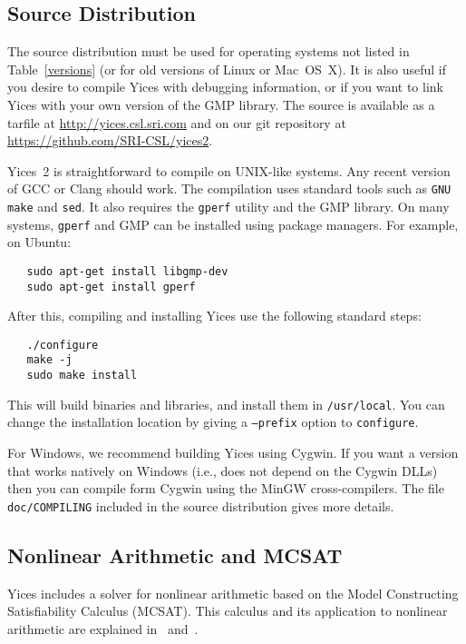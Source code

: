 \documentclass[11pt,twoside,fleqn,openright,titlepage]{cslreport}
\begin{document}
\subsection{Source Distribution}

The source distribution must be used for operating systems not listed
in Table~\ref{versions} (or for old versions of Linux or Mac~OS~X). It
is also useful if you desire to compile Yices with debugging
information, or if you want to link Yices with your own version of the
GMP library. The source is available as a tarfile at
\url{http://yices.csl.sri.com} and on our git repository at
\url{https://github.com/SRI-CSL/yices2}.

\medskip

Yices~2 is straightforward to compile on UNIX-like systems. Any recent
version of GCC or Clang should work. The compilation uses standard
tools such as \texttt{GNU make} and \texttt{sed}. It also requires the
\texttt{gperf} utility and the GMP library. On many systems,
\texttt{gperf} and GMP can be installed using package
managers.  For example, on Ubuntu:
\begin{small}
\begin{verbatim}
   sudo apt-get install libgmp-dev
   sudo apt-get install gperf
\end{verbatim}
\end{small}
After this, compiling and installing Yices use the following standard steps:
\begin{small}
\begin{verbatim}
   ./configure
   make -j
   sudo make install
\end{verbatim}
\end{small}
This will build binaries and libraries, and install them in \texttt{/usr/local}.
You can change the installation location by giving a \texttt{--prefix} option
to \texttt{configure}.

For Windows, we recommend building Yices using Cygwin. If you want a
version that works natively on Windows (i.e., does not depend on the
Cygwin DLLs) then you can compile form Cygwin using the MinGW
cross-compilers.  The file \texttt{doc/COMPILING} included in the
source distribution gives more details.


\subsection{Nonlinear Arithmetic and MCSAT}
\label{mcsat-install}

Yices includes a solver for nonlinear arithmetic based on the Model
Constructing Satisfiability Calculus (MCSAT). This calculus and its
application to nonlinear arithmetic are explained
in~\cite{Jovanovic-etal:MCSATb:2013}
and~\cite{deMouraJovanovic:nla:2012}.
\end{document}
